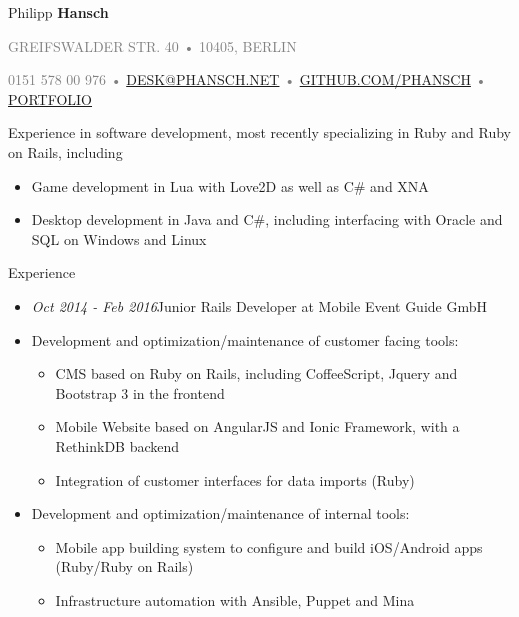 \documentclass[12pt]{article}
\begin{document}
\thispagestyle{empty}



{\Huge Philipp \textbf{Hansch}}

{\footnotesize
  \textcolor{Gray}{
    \uppercase{Greifswalder Str. 40}
    •
    \uppercase{10405, Berlin}
  }

  \textcolor{Gray}{
    0151 578 00 976
    •
    \href{mailto:desk@phansch.net}{\uppercase{desk@phansch.net}}
    •
    \href{http://github.com/phansch}{\uppercase{github.com/phansch}}
    •
    \href{http://portfolio.phansch.net/\#folio-mid}{\uppercase{Portfolio}}
  }
}

\vspace{0.5cm}

Experience in software development, most recently specializing in Ruby and Ruby on Rails, including

\begin{itemize}
  \setlength{\itemsep}{0.1cm}
  \setlength{\parskip}{0.1cm}
  \item Game development in Lua with Love2D as well as C\# and XNA
  \item Desktop development in Java and C\#, including interfacing with Oracle and SQL on Windows and Linux
\end{itemize}
\vspace{0.5cm}

{\Large Experience}
\begin{itemize}
  \setlength{\itemsep}{0cm}
  \setlength{\parskip}{0cm}

  \item[] \emph{Oct 2014 - Feb 2016}\hfill Junior Rails Developer at Mobile Event Guide GmbH
  \item[] Development and optimization/maintenance of customer facing tools:
  \begin{itemize}
    \setlength{\itemsep}{0cm}
    \setlength{\parskip}{0cm}
    \item CMS based on Ruby on Rails, including CoffeeScript, Jquery and Bootstrap 3 in the frontend
    \item Mobile Website based on AngularJS and Ionic Framework, with a RethinkDB backend
    \item Integration of customer interfaces for data imports (Ruby)
  \end{itemize}

  \item[] Development and optimization/maintenance of internal tools:
  \begin{itemize}
    \setlength{\itemsep}{0cm}
    \setlength{\parskip}{0cm}
    \item Mobile app building system to configure and build iOS/Android apps (Ruby/Ruby on Rails)
    \item Infrastructure automation with Ansible, Puppet and Mina
  \end{itemize}
\end{itemize}
\end{document}
